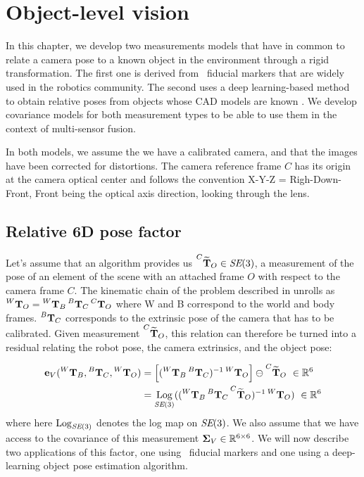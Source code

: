 \chapter{Object-level vision}
\label{chp:object_level}
\minitoc

In this chapter, we develop two measurements models that have in common to relate a camera pose to a known object in the environment through a rigid transformation. The first one 
is derived from \apriltag\ fiducial markers \cite{wang2016iros} that are widely used in the robotics community. The second uses a deep learning-based method
to obtain relative poses from objects whose CAD models are known \cite{labbe2020cosypose}. We develop covariance models for both
measurement types to be able to use them in the context of multi-sensor fusion.

In both models, we assume the we have a calibrated camera, and that the images have been corrected for distortions. The camera reference frame $C$ has its origin at 
the camera optical center and follows the convention X-Y-Z = Righ-Down-Front, Front being the optical axis direction, looking through the lens.

\section{Relative 6D pose factor}
Let's assume that an algorithm provides us $\prescript{C}{}{\widetilde{{\bf T}}}_{O} \in \textit{SE}(3)$, a measurement of the pose of an element 
of the scene with an attached frame $O$ with respect to the camera frame $C$.
The kinematic chain of the problem described in  unrolls as 
$\prescript{W}{}{{\bf T}}_{O} = \prescript{W}{}{{\bf T}}_{B}\prescript{B}{}{{\bf T}}_{C}\prescript{C}{}{{\bf T}}_{O}$ where W and B correspond to the world and body frames. $\prescript{B}{}{{\bf T}}_{C}$ corresponds to the extrinsic pose 
of the camera that has to be calibrated.
Given measurement $\prescript{C}{}{\widetilde{{\bf T}}}_{O}$, this relation can therefore be turned into a residual relating 
the robot pose, the camera extrinsics, and the object pose:

\begin{align}
    {\bf e}_V (\prescript{W}{}{{\bf T}}_{B}, \prescript{B}{}{{\bf T}}_{C}, \prescript{W}{}{{\bf T}}_{O}) 
    &= \left[ (\prescript{W}{}{{\bf T}}_{B}\prescript{B}{}{{\bf T}}_{C})^{-1}\prescript{W}{}{{\bf T}}_{O} \right] \ominus \prescript{C}{}{\widetilde{{\bf T}}}_{O} ~ \in \mathbb{R}^6 \\
    &= \operatorname*{Log}_{\textit{SE}(3)} ( (\prescript{W}{}{{\bf T}}_{B} \prescript{B}{}{{\bf T}}_{C} \prescript{C}{}{\widetilde{{\bf T}}}_{O})^{-1} \prescript{W}{}{{\bf T}}_{O}) ~ \in \mathbb{R}^6
\end{align}
%
where here $\operatorname*{Log}_{\textit{SE}(3)}$ denotes the log map on $\textit{SE}(3)$.
We also assume that we have access to the covariance of this measurement 
\mbox{${\bm \Sigma}_V \in \mathbb{R}^{6 \times 6}$}. We will now describe two applications of this factor, one using \apriltag\ fiducial markers and one using 
a deep-learning object pose estimation algorithm.

